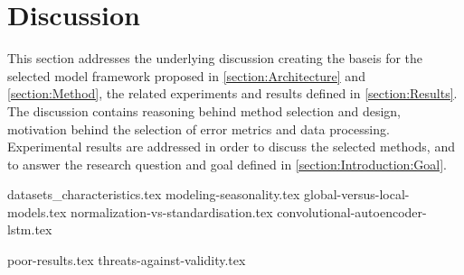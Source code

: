 
\section{Discussion}
\label{section:Discussion:Discussion}

This section addresses the underlying discussion creating the baseis for the selected model framework proposed in \cref{section:Architecture} and \cref{section:Method},
the related experiments and results defined in \cref{section:Results}.
The discussion contains reasoning behind method selection and design,
motivation behind the selection of error metrics and data processing.
Experimental results are addressed in order to discuss the selected methods, and to answer the research question and goal defined in \cref{section:Introduction:Goal}.


\iffalse
  This section presents the underlying discussion creating the basis for the model framework proposed in \Cref{section:Architecture}.
  The discussion concerns the current state of time-series prediction, the motivation behind the method selection, model structure, and the selected error metric.
  This section intendeds to answer the research questions proposed in this paper,
  as well as the reason behind the framework.
\fi




{datasets_characteristics.tex}
{modeling-seasonality.tex}
{global-versus-local-models.tex}
{normalization-vs-standardisation.tex}
{convolutional-autoencoder-lstm.tex}


{poor-results.tex}
{threats-against-validity.tex}











